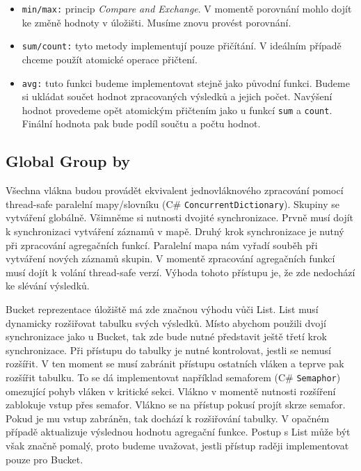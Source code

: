 \begin{itemize}

\item \texttt{min/max:} princip \textit{Compare and Exchange}. V momentě porovnání mohlo dojít ke změně hodnoty v úložišti.
Musíme znovu provést porovnání.  

\item \texttt{sum/count:} tyto metody implementují pouze přičítání. 
V ideálním případě chceme použít atomické operace přičtení.
 
\item \texttt{avg:} tuto funkci budeme implementovat stejně jako původní funkci. 
Budeme si ukládat součet hodnot zpracovaných výsledků a jejich počet.
Navýšení hodnot provedeme opět atomickým přičtením jako u funkcí \texttt{sum} a \texttt{count}.
Finální hodnota pak bude podíl součtu a počtu hodnot.
\end{itemize}

\subsection{Global Group by} \label{anal.groupby.global}

Všechna vlákna budou provádět ekvivalent jednovláknového zpracování pomocí thread-safe paralelní mapy/slovníku (C\# \texttt{ConcurrentDictionary}).
Skupiny se vytváření globálně.
Všimněme si nutnosti dvojité synchronizace.
Prvně musí dojít k synchronizaci vytváření záznamů v mapě.
Druhý krok synchronizace je nutný při zpracování agregačních funkcí.
Paralelní mapa nám vyřadí souběh při vytváření nových záznamů skupin.
V momentě zpracování agregačních funkcí musí dojít k volání thread-safe verzí.
Výhoda tohoto přístupu je, že zde nedochází ke slévání výsledků.

Bucket reprezentace úložiště má zde značnou výhodu vůči List.
List musí dynamicky rozšiřovat tabulku svých výsledků.
Místo abychom použili dvojí synchronizace jako u Bucket, tak zde bude nutné představit ještě třetí krok synchronizace.
Při přístupu do tabulky je nutné kontrolovat, jestli se nemusí rozšířit.
V ten moment se musí zabránit přístupu ostatních vláken a teprve pak rozšířit tabulku.
To se dá implementovat například semaforem (C\# \texttt{Semaphor}) omezující pohyb vláken v kritické sekci.
Vlákno v momentě nutnosti rozšíření zablokuje vstup přes semafor.
Vlákno se na přístup pokusí projít skrze semafor.
Pokud je mu vstup zabráněn, tak dochází k rozšiřování tabulky.
V opačném případě aktualizuje výslednou hodnotu agregační funkce.
Postup s List může být však značně pomalý, proto budeme uvažovat, jestli přístup raději implementovat pouze pro Bucket.


